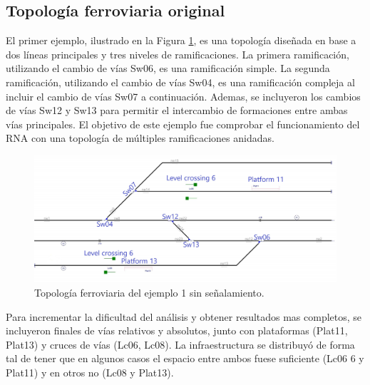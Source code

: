 \subsection{Topología ferroviaria original}

	El primer ejemplo, ilustrado en la Figura \ref{fig:EJ1_1}, es una topología diseñada en base a dos líneas principales y tres niveles de ramificaciones. La primera ramificación, utilizando el cambio de vías Sw06, es una ramificación simple. La segunda ramificación, utilizando el cambio de vías Sw04, es una ramificación compleja al incluir el cambio de vías Sw07 a continuación. Ademas, se incluyeron los cambios de vías Sw12 y Sw13 para permitir el intercambio de formaciones entre ambas vías principales. El objetivo de este ejemplo fue comprobar el funcionamiento del RNA con una topología de múltiples ramificaciones anidadas.
	
	\begin{figure}[h]
		\centering
		\includegraphics[width=1\textwidth]{resultados-obtenidos/ejemplo1/images/1_empty.png}
		\centering\caption{Topología ferroviaria del ejemplo 1 sin señalamiento.}
		\label{fig:EJ1_1}
	\end{figure}
	
	Para incrementar la dificultad del análisis y obtener resultados mas completos, se incluyeron finales de vías relativos y absolutos, junto con plataformas (Plat11, Plat13) y cruces de vías (Lc06, Lc08). La infraestructura se distribuyó de forma tal de tener que en algunos casos el espacio entre ambos fuese suficiente (Lc06 6 y Plat11) y en otros no (Lc08 y Plat13).
